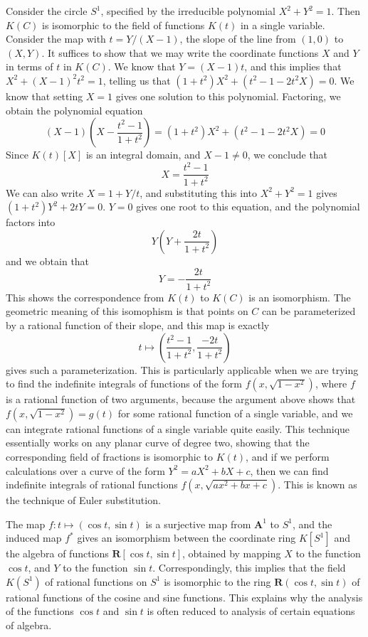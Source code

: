 \begin{example}
    Consider the circle $S^1$, specified by the irreducible polynomial $X^2 + Y^2 = 1$. Then $K(C)$ is isomorphic to the field of functions $K(t)$ in a single variable. Consider the map with $t = Y/(X - 1)$, the slope of the line from $(1,0)$ to $(X,Y)$. It suffices to show that we may write the coordinate functions $X$ and $Y$ in terms of $t$ in $K(C)$. We know that $Y = (X - 1)t$, and this implies that $X^2 + (X - 1)^2t^2 = 1$, telling us that $(1 + t^2)X^2 + (t^2 - 1 - 2t^2X) = 0$. We know that setting $X = 1$ gives one solution to this polynomial. Factoring, we obtain the polynomial equation
    \[ \left( X - 1 \right) \left(X - \frac{t^2 - 1}{1 + t^2} \right) = (1 + t^2)X^2 + (t^2 - 1 - 2t^2X) = 0 \]
    Since $K(t)[X]$ is an integral domain, and $X - 1 \neq 0$, we conclude that
    \[ X = \frac{t^2 - 1}{1 + t^2} \]
    We can also write $X = 1 + Y/t$, and substituting this into $X^2 + Y^2 = 1$ gives $(1 +t^2) Y^2 + 2tY = 0$. $Y = 0$ gives one root to this equation, and the polynomial factors into
    \[ Y \left( Y + \frac{2t}{1 + t^2} \right) \]
    and we obtain that
    \[ Y = - \frac{2t}{1 + t^2} \]
    This shows the correspondence from $K(t)$ to $K(C)$ is an isomorphism. The geometric meaning of this isomophism is that points on $C$ can be parameterized by a rational function of their slope, and this map is exactly
    \[ t \mapsto \left( \frac{t^2 - 1}{1 + t^2}, \frac{-2t}{1 + t^2} \right) \]
    gives such a parameterization. This is particularly applicable when we are trying to find the indefinite integrals of functions of the form $f(x,\sqrt{1-x^2})$, where $f$ is a rational function of two arguments, because the argument above shows that $f(x,\sqrt{1-x^2}) = g(t)$ for some rational function of a single variable, and we can integrate rational functions of a single variable quite easily. This technique essentially works on any planar curve of degree two, showing that the corresponding field of fractions is isomorphic to $K(t)$, and if we perform calculations over a curve of the form $Y^2 = aX^2 + bX + c$, then we can find indefinite integrals of rational functions $f(x,\sqrt{ax^2 + bx + c})$. This is known as the technique of Euler substitution.
\end{example}

\begin{example}
    The map $f: t \mapsto (\cos t, \sin t)$ is a surjective map from $\mathbf{A}^1$ to $S^1$, and the induced map $f^*$ gives an isomorphism between the coordinate ring $K[S^1]$ and the algebra of functions $\mathbf{R}[\cos t, \sin t]$, obtained by mapping $X$ to the function $\cos t$, and $Y$ to the function $\sin t$. Correspondingly, this implies that the field $K(S^1)$ of rational functions on $S^1$ is isomorphic to the ring $\mathbf{R}(\cos t, \sin t)$ of rational functions of the cosine and sine functions. This explains why the analysis of the functions $\cos t$ and $\sin t$ is often reduced to analysis of certain equations of algebra.
\end{example}

